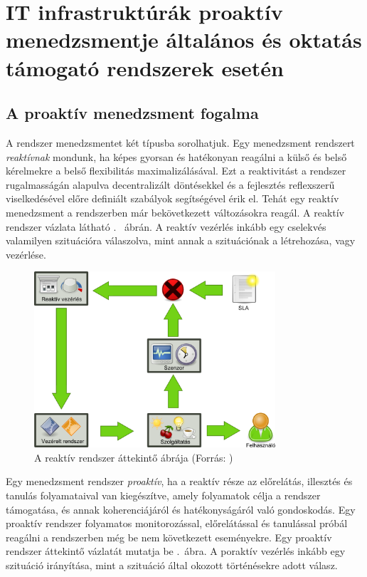 \chapter{IT infrastruktúrák proaktív menedzsmentje általános és oktatás támogató rendszerek esetén}

\section{A proaktív menedzsment fogalma}

A rendszer menedzsmentet két típusba sorolhatjuk.  Egy menedzsment rendszert \textit{reaktívnak} mondunk, ha képes gyorsan és hatékonyan reagálni a külső és belső kérelmekre a belső flexibilitás maximalizálásával. Ezt a reaktivitást a rendszer rugalmasságán alapulva decentralizált döntésekkel és a fejlesztés reflexszerű viselkedésével előre definiált szabályok segítségével érik el.\cite{aftsarapms} Tehát egy reaktív menedzsment a rendszerben már bekövetkezett változásokra reagál. A reaktív rendszer vázlata látható .~ ábrán. A reaktív vezérlés inkább egy cselekvés valamilyen szituációra válaszolva, mint annak a szituációnak a létrehozása, vagy vezérlése.\cite{patariczapro}

\begin{figure}[h!]
\centering
\includegraphics[width=0.80\textwidth]{figures/reactive_system.png}
\caption{A reaktív rendszer áttekintő ábrája (Forrás: \cite{patariczapro}) \label{fig:reactive_system}}
\end{figure}

Egy menedzsment rendszer \textit{proaktív}, ha a reaktív része az előrelátás, illesztés és tanulás folyamataival van kiegészítve, amely folyamatok célja a rendszer támogatása, és annak koherenciájáról és hatékonyságáról való gondoskodás. Egy proaktív rendszer folyamatos monitorozással, előrelátással és tanulással próbál reagálni a rendszerben még be nem következett eseményekre. Egy proaktív rendszer áttekintő vázlatát mutatja be .~ábra. A poraktív vezérlés inkább egy szituáció irányítása, mint a szituáció által okozott történésekre adott válasz. \cite{patariczapro}

